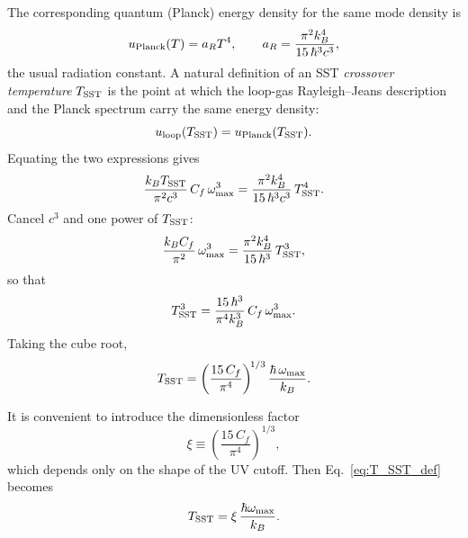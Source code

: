 \documentclass[11pt]{article}
\begin{document}
            The corresponding quantum (Planck) energy density for the same mode
            density is
            \begin{equation}
                u_{\rm Planck}(T)
                = a_R T^4,
                \qquad
                a_R
                = \frac{\pi^2 k_B^4}{15\,\hbar^3 c^3},
            \end{equation}
            the usual radiation constant.  A natural definition of an SST
            \emph{crossover temperature} $T_{\rm SST}$ is the point at which the
            loop-gas Rayleigh--Jeans description and the Planck spectrum carry the
            same energy density:
            \begin{equation}
                u_{\rm loop}(T_{\rm SST})
                = u_{\rm Planck}(T_{\rm SST}).
            \end{equation}
            Equating the two expressions gives
            \begin{equation}
                \frac{k_B T_{\rm SST}}{\pi^2 c^3}\,C_f\,\omega_{\max}^3
                = \frac{\pi^2 k_B^4}{15\,\hbar^3 c^3}\,T_{\rm SST}^4.
            \end{equation}
            Cancel $c^3$ and one power of $T_{\rm SST}$:
            \begin{equation}
                \frac{k_B C_f}{\pi^2}\,\omega_{\max}^3
                = \frac{\pi^2 k_B^4}{15\,\hbar^3}\,T_{\rm SST}^3,
            \end{equation}
            so that
            \begin{equation}
                T_{\rm SST}^3
                = \frac{15\,\hbar^3}{\pi^4 k_B^3}\,C_f\,\omega_{\max}^3.
            \end{equation}
            Taking the cube root,
            \begin{equation}
                T_{\rm SST}
                = \left(\frac{15\,C_f}{\pi^4}\right)^{\!1/3}
                \frac{\hbar\,\omega_{\max}}{k_B}.
                \label{eq:T_SST_def}
            \end{equation}

            It is convenient to introduce the dimensionless factor
            \begin{equation}
                \xi
                \equiv \left(\frac{15\,C_f}{\pi^4}\right)^{\!1/3},
            \end{equation}
            which depends only on the shape of the UV cutoff.  Then
            Eq.~\eqref{eq:T_SST_def} becomes
            \begin{equation}
                T_{\rm SST}
                = \xi\,\frac{\hbar\omega_{\max}}{k_B}.
                \label{eq:T_SST_xi_omega}
            \end{equation}
\end{document}
